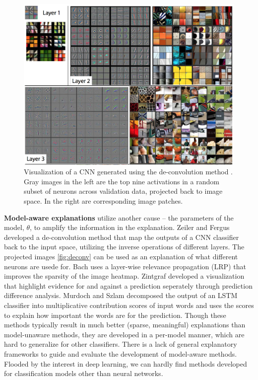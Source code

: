 

\begin{figure}[tb]
  \centering
  \includegraphics[width=1.0\textwidth]{figure/deconv}
  \caption{Visualization of a CNN generated using the de-convolution method \cite{zeiler2014eccv}. Gray images in the left are the top nine activations in a random subset of neurons across validation data, projected back to image space. In the right are corresponding image patches.}
  \label{fig:deconv}
\end{figure}

\textbf{Model-aware explanations} utilize another cause -- the parameters of the model, $\theta$, to amplify the information in the explanation. Zeiler and Fergus \cite{zeiler2014eccv} developed a de-convolution method that map the outputs of a CNN classifier back to the input space, utilizing the inverse operations of different layers. The projected images \autoref{fig:deconv} can be used as an explanation of what different neurons are usede for. Bach \etal \cite{bach15plos} uses a layer-wise relevance propagation (LRP) that improves the sparsity of the image heatmap. Zintgraf \etal \cite{zintgraf17visualize} developed a visualization that highlight evidence for and against a prediction seperately through prediction difference analysis. Murdoch and Szlam \cite{murdoch2017rule} decomposed the output of an LSTM classifier into multiplicative contribution scores of input words and uses the scores to explain how important the words are for the prediction. Though these methods typically result in much better (sparse, meaningful) explanations than model-unaware methods, they are developed in a per-model manner, which are hard to generalize for other classifiers. There is a lack of general explanatory frameworks to guide and evaluate the development of model-aware methods. Flooded by the interest in deep learning, we can hardly find methods developed for classification models other than neural networks.

